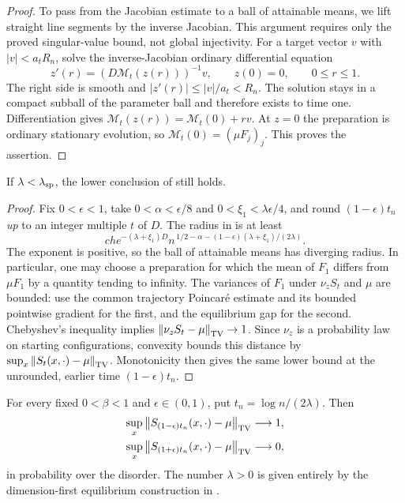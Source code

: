 \begin{proof}
To pass from the Jacobian estimate to a ball of attainable means, we
lift straight line segments by the inverse Jacobian.  This argument
requires only the proved singular-value bound, not global injectivity.
For a target vector $v$ with $|v|<a_tR_n$, solve the inverse-Jacobian
ordinary differential equation
\[
 z'(r)=(D\mathcal M_t(z(r)))^{-1}v,\qquad z(0)=0,
 \qquad 0\le r\le1.
\]
The right side is smooth and $|z'(r)|\le |v|/a_t<R_n$.
The solution stays in a compact subball of the parameter ball and
therefore exists to time one.  Differentiation gives
$\mathcal M_t(z(r))=\mathcal M_t(0)+rv$.
At $z=0$ the preparation is ordinary stationary evolution, so
$\mathcal M_t(0)=(\mu F_j)_j$.  This proves the assertion.
\end{proof}

\begin{lemma}
\label{lem:cutoff-visible-lower}
If $\lambda<\lambda_{\rm sp}$, the lower conclusion of
 still holds.
\end{lemma}

\begin{proof}
Fix $0<\epsilon<1$, take $0<\alpha<\epsilon/8$ and
$0<\xi_1<\lambda\epsilon/4$, and round
$(1-\epsilon)t_n$ \emph{up} to an integer multiple $t$ of $D$.
The radius in  is at least
\[
 c h e^{-(\lambda+\xi_1)D}
 n^{\,1/2-\alpha-(1-\epsilon)(\lambda+\xi_1)/(2\lambda)}.
\]
The exponent is positive, so the ball of attainable means has diverging
radius.  In particular, one may choose a preparation for which the mean
of $F_1$ differs from $\mu F_1$ by a quantity tending to infinity.
The variances of $F_1$ under $\nu_zS_t$ and $\mu$ are bounded:
use the common trajectory Poincar\'e estimate and its bounded
pointwise gradient for the first, and the equilibrium gap for the
second.  Chebyshev's inequality implies
$\left\lVert \nu_zS_t-\mu\right\rVert_{\operatorname{TV}}\to1$.
Since $\nu_z$ is a probability law on starting configurations,
convexity bounds this distance by
$\sup_x\left\lVert S_t(x,\cdot)-\mu\right\rVert_{\operatorname{TV}}$.
Monotonicity then gives the same lower bound at the unrounded,
earlier time $(1-\epsilon)t_n$.
\end{proof}

\begin{theorem}
\label{thm:cutoff-continuous}
For every fixed $0<\beta<1$ and $\epsilon\in(0,1)$, put
$t_n=\log n/(2\lambda)$.  Then
\begin{equation}
 \begin{aligned}
 \sup_x\left\lVert S_{(1-\epsilon)t_n}(x,\cdot)-\mu\right\rVert_{\operatorname{TV}}
       &\longrightarrow1,\\
 \sup_x\left\lVert S_{(1+\epsilon)t_n}(x,\cdot)-\mu\right\rVert_{\operatorname{TV}}
       &\longrightarrow0,
 \end{aligned}
 \label{eq:cutoff-continuous}
\end{equation}
in probability over the disorder.  The number $\lambda>0$ is given
entirely by the dimension-first equilibrium construction in
.
\end{theorem}

